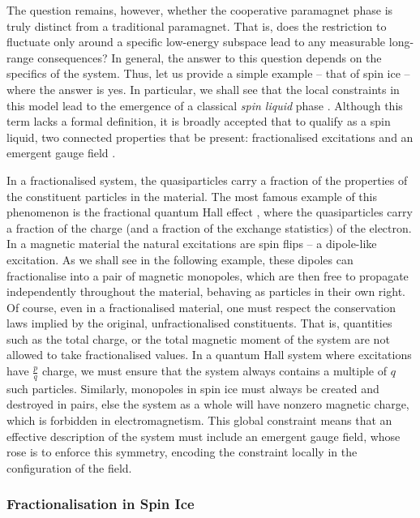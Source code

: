 The question remains, however, whether the cooperative paramagnet phase is truly distinct from a traditional paramagnet. That is, does the restriction to fluctuate only around a specific low-energy subspace lead to any measurable long-range consequences? In general, the answer to this question depends on the specifics of the system. Thus, let us provide a simple example -- that of spin ice -- where the answer is yes. In particular, we shall see that the local constraints in this model lead to the emergence of a classical \textit{spin liquid} phase \cite{castelnovo_magnetic_2008,castelnovo_spin_2012,balents_spin_2010}. Although this term lacks a formal definition, it is broadly accepted that to qualify as a spin liquid, two connected properties that be present: fractionalised excitations and an emergent gauge field \cite{savary_quantum_2017,knolle_field_2019}.

In a fractionalised system, the quasiparticles carry a fraction of the properties of the constituent particles in the material. The most famous example of this phenomenon is the fractional quantum Hall effect \cite{laughlin_nobel_1999}, where the quasiparticles carry a fraction of the charge (and a fraction of the exchange statistics) of the electron. In a magnetic material the natural excitations are spin flips -- a dipole-like excitation. As we shall see in the following example, these dipoles can fractionalise into a pair of magnetic monopoles, which are then free to propagate independently throughout the material, behaving as particles in their own right. Of course, even in a fractionalised material, one must respect the conservation laws implied by the original, unfractionalised constituents. That is, quantities such as the total charge, or the total magnetic moment of the system are not allowed to take fractionalised values. In a quantum Hall system where excitations have $\frac pq$ charge, we must ensure that the system always contains a multiple of $q$ such particles. Similarly, monopoles in spin ice must always be created and destroyed in pairs, else the system as a whole will have nonzero magnetic charge, which is forbidden in electromagnetism. This global constraint means that an effective description of the system must include an emergent gauge field, whose rose is to enforce this symmetry, encoding the constraint locally in the configuration of the field. 

\subsubsection{Fractionalisation in Spin Ice}

